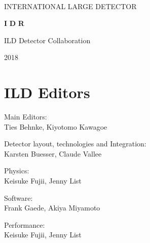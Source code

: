 %
%
\begin{titlepage}
\begin{center}
~
 ~\vskip 4cm

    {\huge  INTERNATIONAL} 
    {\huge  LARGE} 
    {\huge  DETECTOR}
    
  \vskip 1.2cm

    {\huge \bfseries I}
    {\huge \bfseries D}
    {\huge \bfseries R}

  \vskip 1.2cm




{\huge ILD Detector Collaboration} \\
    
  \vskip 0.5cm

{\huge }

  \vskip 3cm

    {\huge 2018}

\end{center}
\end{titlepage}

\newpage\thispagestyle{empty}
\cleardoublepage


\chapter*{ILD Editors}
\noindent Main Editors:\\
Ties Behnke, Kiyotomo Kawagoe

\vspace*{2mm}

\noindent Detector layout, technologies and Integration:\\
Karsten Buesser, Claude Vallee

\vspace*{2mm}
\noindent Physics:\\
Keisuke Fujii, Jenny List

\vspace*{2mm}
\noindent Software:\\
Frank Gaede, Akiya Miyamoto

\vspace*{2mm}
\noindent Performance:\\
Keisuke Fujii, Jenny List

